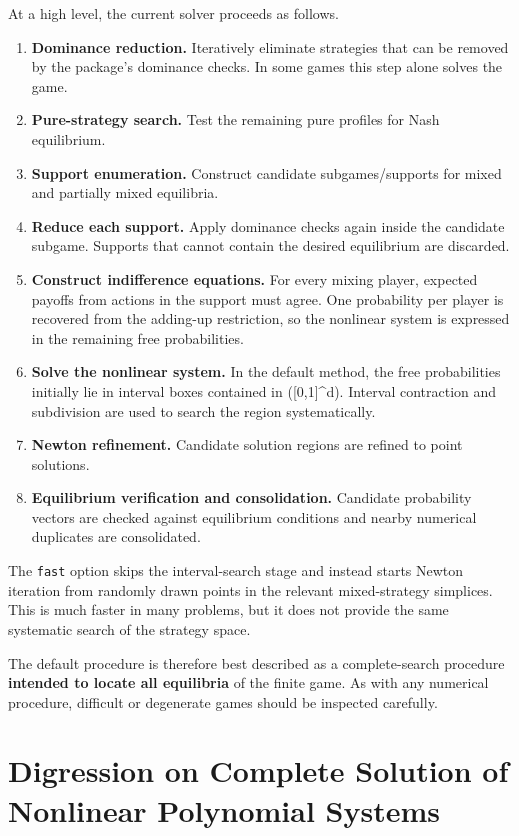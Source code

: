\documentclass[11pt]{article}
\begin{document}
At a high level, the current solver proceeds as follows.

\begin{enumerate}
\def\labelenumi{\arabic{enumi}.}
\item
  \textbf{Dominance reduction.} Iteratively eliminate strategies that
  can be removed by the package's dominance checks. In some games this
  step alone solves the game.
\item
  \textbf{Pure-strategy search.} Test the remaining pure profiles for
  Nash equilibrium.
\item
  \textbf{Support enumeration.} Construct candidate subgames/supports
  for mixed and partially mixed equilibria.
\item
  \textbf{Reduce each support.} Apply dominance checks again inside the
  candidate subgame. Supports that cannot contain the desired
  equilibrium are discarded.
\item
  \textbf{Construct indifference equations.} For every mixing player,
  expected payoffs from actions in the support must agree. One
  probability per player is recovered from the adding-up restriction, so
  the nonlinear system is expressed in the remaining free probabilities.
\item
  \textbf{Solve the nonlinear system.} In the default method, the free
  probabilities initially lie in interval boxes contained in
  ({[}0,1{]}\^{}d). Interval contraction and subdivision are used to
  search the region systematically.
\item
  \textbf{Newton refinement.} Candidate solution regions are refined to
  point solutions.
\item
  \textbf{Equilibrium verification and consolidation.} Candidate
  probability vectors are checked against equilibrium conditions and
  nearby numerical duplicates are consolidated.
\end{enumerate}

The \texttt{fast} option skips the interval-search stage and instead
starts Newton iteration from randomly drawn points in the relevant
mixed-strategy simplices. This is much faster in many problems, but it
does not provide the same systematic search of the strategy space.

The default procedure is therefore best described as a complete-search
procedure \textbf{intended to locate all equilibria} of the finite game.
As with any numerical procedure, difficult or degenerate games should be
inspected carefully.

    \section*{Digression on Complete Solution of Nonlinear Polynomial
Systems}\label{digression-on-complete-solution-of-nonlinear-polynomial-systems}
\end{document}
